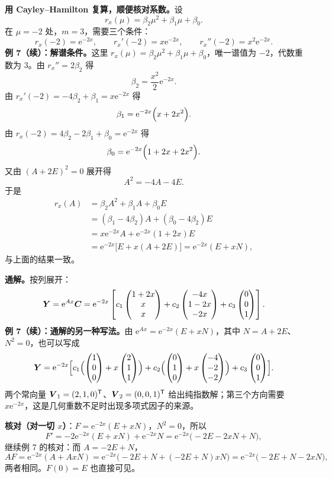 \documentclass[11pt]{ctexart}
\newcommand{\mat}[1]{\begin{pmatrix}#1\end{pmatrix}}
\newcommand{\ee}{\mathrm{e}}
\begin{document}
\textbf{用 Cayley--Hamilton 复算，顺便核对系数。}设
\[
r_x(\mu)=\beta_2\mu^2+\beta_1\mu+\beta_0 .
\]
在 $\mu=-2$ 处，$m=3$，需要三个条件：
\[
r_x(-2)=\ee^{-2x},\qquad r_x'(-2)=x\ee^{-2x},\qquad r_x''(-2)=x^2\ee^{-2x}.
\]
\textbf{例 7（续）：解谱条件。}这里 $r_x(\mu)=\beta_2\mu^2+\beta_1\mu+\beta_0$，唯一谱值为 $-2$，代数重数为 $3$。由 $r_x''=2\beta_2$ 得
\[
\beta_2=\frac{x^2}{2}\ee^{-2x}.
\]
由 $r_x'(-2)=-4\beta_2+\beta_1=x\ee^{-2x}$ 得
\[
\beta_1=\ee^{-2x}\Bigl(x+2x^2\Bigr).
\]
由 $r_x(-2)=4\beta_2-2\beta_1+\beta_0=\ee^{-2x}$ 得
\[
\beta_0=\ee^{-2x}\Bigl(1+2x+2x^2\Bigr).
\]
又由 $(A+2E)^2=0$ 展开得
\[
A^2=-4A-4E .
\]
于是
\[
\begin{aligned}
r_x(A)&=\beta_2A^2+\beta_1A+\beta_0E\\
&=(\beta_1-4\beta_2)A+(\beta_0-4\beta_2)E\\
&=x\ee^{-2x}A+\ee^{-2x}(1+2x)E\\
&=\ee^{-2x}\bigl[E+x(A+2E)\bigr]=\ee^{-2x}(E+xN),
\end{aligned}
\]
与上面的结果一致。

\textbf{通解。}按列展开：
\[
\vect{Y}=\ee^{Ax}\vect{C}
=\ee^{-2x}\left[
c_1\mat{1+2x\\x\\x}
+c_2\mat{-4x\\1-2x\\-2x}
+c_3\mat{0\\0\\1}
\right].
\]
\textbf{例 7（续）：通解的另一种写法。}由 $\ee^{Ax}=\ee^{-2x}(E+xN)$，其中 $N=A+2E$、$N^2=0$，也可以写成
\[
\vect{Y}=\ee^{-2x}\Bigl[c_1\Bigl(\mat{1\\0\\0}+x\mat{2\\1\\1}\Bigr)
+c_2\Bigl(\mat{0\\1\\0}+x\mat{-4\\-2\\-2}\Bigr)
+c_3\mat{0\\0\\1}\Bigr].
\]
两个常向量 $\boldsymbol{V}_1=(2,1,0)^{\mathsf T}$、$\boldsymbol{V}_2=(0,0,1)^{\mathsf T}$ 给出纯指数解；第三个方向需要 $x\ee^{-2x}$，这是几何重数不足时出现多项式因子的来源。

\textbf{核对（对一切 $x$）}：$F=\ee^{-2x}(E+xN)$，$N^2=0$，所以
\[
F'=-2\ee^{-2x}(E+xN)+\ee^{-2x}N
=\ee^{-2x}\bigl(-2E-2xN+N\bigr),
\]
继续例 7 的核对：而 $A=-2E+N$，
\[
AF=\ee^{-2x}(A+AxN)
=\ee^{-2x}\bigl(-2E+N+(-2E+N)xN\bigr)
=\ee^{-2x}\bigl(-2E+N-2xN\bigr),
\]
两者相同。$F(0)=E$ 也直接可见。
\end{document}
